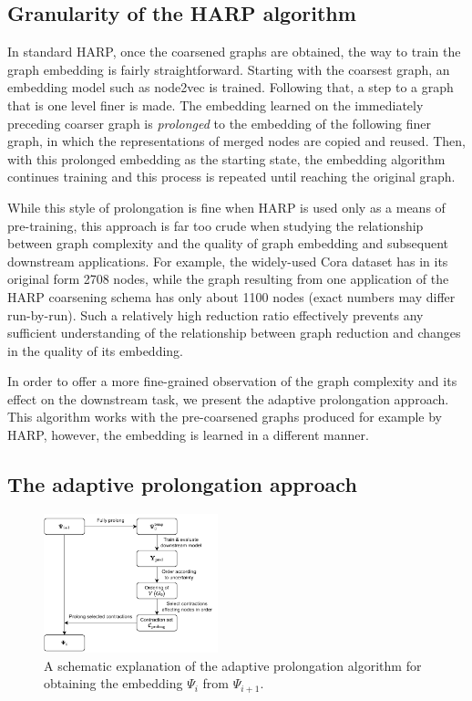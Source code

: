 \documentclass[sn-mathphys,pdflatex,iicol]{sn-jnl}%
\newcommand{\name}[1]{\textit{#1}}
\begin{document}
\subsection{Granularity of the HARP algorithm}

In standard HARP, once the coarsened graphs are obtained, the way to train the graph embedding is fairly straightforward. Starting with the coarsest graph, an embedding model such as node2vec is trained. Following that, a step to a graph that is one level finer is made. The embedding learned on the immediately preceding coarser graph is \name{prolonged} to the embedding of the following finer graph, in which the representations of merged nodes are copied and reused.
 Then, with this prolonged embedding as the starting state, the embedding algorithm continues training and this process is repeated until reaching the original graph.

While this style of prolongation is fine when HARP is used only as a means of pre-training, this approach is far too crude when studying the relationship between graph complexity and the quality of graph embedding and subsequent downstream applications. For example, the widely-used Cora dataset \cite{yang_revisiting_2016} has in its original form 2708 nodes, while the graph resulting from one application of the HARP coarsening schema has only about 1100 nodes (exact numbers may differ run-by-run). Such a relatively high reduction ratio effectively prevents any sufficient understanding of the relationship between graph reduction and changes in the quality of its embedding.

In order to offer a more fine-grained observation of the graph complexity and its effect on the downstream task, we present the adaptive prolongation approach. This algorithm works with the pre-coarsened graphs produced for example by HARP, however, the embedding is learned in a different manner.

\subsection{The adaptive prolongation approach}\label{sec:adaptive-prolongation}

\begin{figure}
  \centering
  \includegraphics[width=0.45\textwidth]{images/adaptive-prolongation/adaptive-prolongation.pdf}
    \caption{A schematic explanation of the adaptive prolongation algorithm for obtaining the embedding \( \Psi_{i} \) from \( \Psi_{i + 1} \).}
  \label{fig:adaptive-prolongation}
\end{figure}
\end{document}
